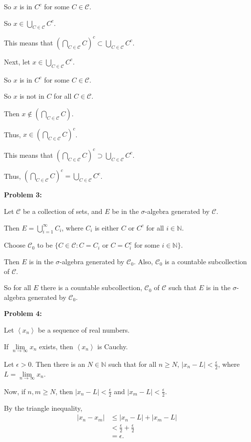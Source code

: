 \documentclass[a4paper,12pt]{article}
\newcommand{\tab}{\hspace{4mm}} %
\newcommand{\shunt}{\vspace{20mm}}
\newcommand{\absval}[1]{\lvert #1 \rvert}
\newcommand{\anbrack}[1]{\left\langle #1 \right\rangle}
\newcommand{\ep}{\epsilon}
\newcommand{\N}{\mathbb{N}}
\newcommand{\scrC}{\mathcal{C}}
\begin{document}
\tab So $x$ is in $C^c$ for some $C \in \scrC$.

\tab So $x \in \bigcup\limits_{C \in \scrC} C^c$.

This means that $(\bigcap\limits_{C \in \scrC} C)^c \subset \bigcup\limits_{C \in \scrC} C^c$.

Next, let $x \in \bigcup\limits_{C \in \scrC} C^c$.

\tab So $x$ is in $C^c$ for some $C \in \scrC$.

\tab So $x$ is not in $C$ for all $C \in \scrC$.

\tab Then $x \notin (\bigcap\limits_{C \in \scrC} C)$.

\tab Thus, $x \in (\bigcap\limits_{C \in \scrC} C)^c$.

This means that $(\bigcap\limits_{C \in \scrC} C)^c \supset \bigcup\limits_{C \in \scrC} C^c$.

Thus, $(\bigcap\limits_{C \in \scrC} C)^c = \bigcup\limits_{C \in \scrC} C^c$.

\shunt

{\bf Problem 3:}

Let $\scrC$ be a collection of sets, and $E$ be in the $\sigma$-algebra generated by $\scrC$.

Then $E = \bigcup\limits_{i=1}^\infty C_i$, where $C_i$ is either $C$ or $C^c$ for all $i \in \N$.

Choose $\scrC_0$ to be $\{C \in \scrC : C = C_i $ or $C = C_i^c$ for some $i \in \N\}$.

Then $E$ is in the $\sigma$-algebra generated by $\scrC_0$. Also, $\scrC_0$ is a countable subcollection of $\scrC$.

So for all $E$ there is a countable subcollection, $\scrC_0$ of $\scrC$ such that $E$ is in the $\sigma$-algebra generated by $\scrC_0$.

\shunt

{\bf Problem 4:}

Let $\anbrack{x_n}$ be a sequence of real numbers.

If $\lim\limits_{n \to \infty} x_n$ exists, then $\anbrack{x_n}$ is Cauchy.

\tab Let $\ep >0$. Then there is an $N \in \N$ such that for all $n \geq N$, $\absval{x_n - L} < \frac{\ep}{2}$, where $L = \lim\limits_{n \to \infty} x_n$.

\tab Now, if $n,m \geq N$, then $\absval{x_n - L} < \frac{\ep}{2}$ and $\absval{x_m - L} < \frac{\ep}{2}$.

\tab By the triangle inequality,
\begin{align*}
\absval{x_n - x_m} &\leq \absval{x_n - L} + \absval{x_m -L} \\
&< \frac{\ep}{2} + \frac{\ep}{2} \\
&= \ep.
\end{align*}
\end{document}
